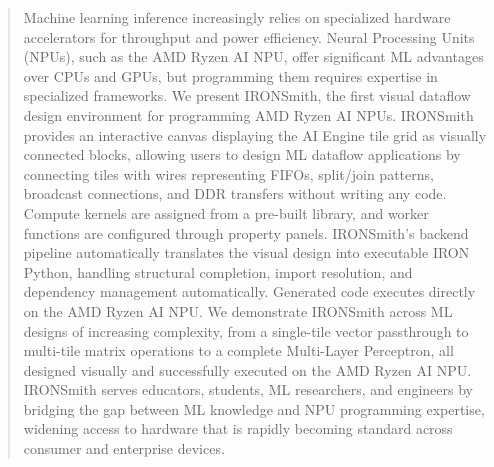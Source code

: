 \begin{abstract}
\vspace{-3mm}
Machine learning inference increasingly relies on specialized hardware accelerators for throughput and power efficiency. Neural Processing Units (NPUs), such as the AMD Ryzen AI NPU, offer significant ML advantages over CPUs and GPUs, but programming them requires expertise in specialized frameworks. 
We present IRONSmith, the first visual dataflow design environment for programming AMD Ryzen AI NPUs. IRONSmith provides an interactive canvas displaying the AI Engine tile grid as visually connected blocks, allowing users to design ML dataflow applications by connecting tiles with wires representing FIFOs, split/join patterns, broadcast connections, and DDR transfers without writing any code. Compute kernels are assigned from a pre-built library, and worker functions are configured through property panels.
IRONSmith's backend pipeline automatically translates the visual design into executable IRON Python, handling structural completion, import resolution, and dependency management automatically. Generated code executes directly on the AMD Ryzen AI NPU. We demonstrate IRONSmith across ML designs of increasing complexity, from a single-tile vector passthrough to multi-tile matrix operations to a complete Multi-Layer Perceptron, all designed visually and successfully executed on the AMD Ryzen AI NPU. IRONSmith serves educators, students, ML researchers, and engineers by bridging the gap between ML knowledge and NPU programming expertise, widening access to hardware that is rapidly becoming standard across consumer and enterprise devices. 
\vspace{-4mm}
\end{abstract}


